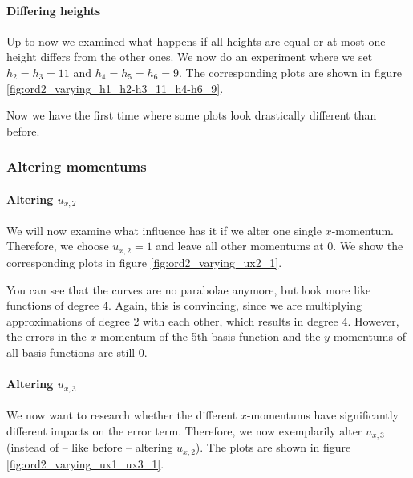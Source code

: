 \documentclass{article}
\begin{document}
\paragraph{Differing heights}

Up to now we examined what happens if all heights are equal or at most one height differs from the other ones. We now do an experiment where we set $h_2=h_3=11$ and $h_4=h_5=h_6=9$. The corresponding plots are shown in figure \ref{fig:ord2_varying_h1_h2-h3_11_h4-h6_9}.



Now we have the first time where some plots look drastically different than before.

\clearpage{}

\subsubsection{Altering momentums}
\label{sec:stiffness-analysis-ord2-altering-momentums}

\paragraph{Altering $u_{x,2}$}

We will now examine what influence has it if we alter one single $x$-momentum. Therefore, we choose $u_{x,2}=1$ and leave all other momentums at 0. We show the corresponding plots in figure \ref{fig:ord2_varying_ux2_1}.



You can see that the curves are no parabolae anymore, but look more like functions of degree 4. Again, this is convincing, since we are multiplying approximations of degree 2 with each other, which results in degree 4. However, the errors in the $x$-momentum of the 5th basis function and the $y$-momentums of all basis functions are still 0.

\paragraph{Altering $u_{x,3}$}

We now want to research whether the different $x$-momentums have significantly different impacts on the error term. Therefore, we now exemplarily alter $u_{x,3}$ (instead of -- like before -- altering $u_{x,2}$). The plots are shown in figure \ref{fig:ord2_varying_ux1_ux3_1}.
\end{document}
